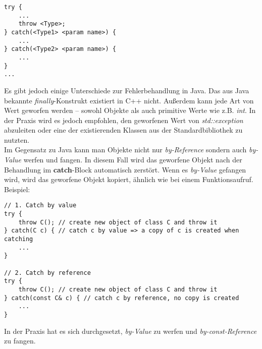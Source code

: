 \documentclass[
  accentcolor=tud1c,	%
  colorbacktitle,		%
  inverttitle,			%
  german,				%
  twoside
]{tudexercise}
\begin{document}
\begin{lstlisting}
try {
	...
	throw <Type>;
} catch(<Type1> <param name>) {
	...
} catch(<Type2> <param name>) {
	...
}
...
\end{lstlisting} 

Es gibt jedoch einige Unterschiede zur Fehlerbehandlung in Java.
Das aus Java bekannte \emph{finally}-Konstrukt existiert in C++ nicht.
Außerdem kann jede Art von Wert geworfen werden -- sowohl Objekte als auch primitive Werte wie z.B. \emph{int}.
In der Praxis wird es jedoch empfohlen, den geworfenen Wert von \emph{std::exception} abzuleiten oder eine der existierenden Klassen aus der Standardbibliothek zu nutzten. \\

Im Gegensatz zu Java kann man Objekte nicht nur \emph{by-Reference} sondern auch \emph{by-Value} werfen und fangen. In diesem Fall wird das geworfene Objekt nach der Behandlung im \textbf{catch}-Block automatisch zerstört. Wenn es \emph{by-Value} gefangen wird, wird das geworfene Objekt kopiert, ähnlich wie bei einem Funktionsaufruf. Beispiel:

\begin{lstlisting}
// 1. Catch by value
try {
	throw C(); // create new object of class C and throw it 
} catch(C c) { // catch c by value => a copy of c is created when catching
	...
}

// 2. Catch by reference
try {
	throw C(); // create new object of class C and throw it 
} catch(const C& c) { // catch c by reference, no copy is created
	...
}
\end{lstlisting} 

In der Praxis hat es sich durchgesetzt, \emph{by-Value} zu werfen und \emph{by-const-Reference} zu fangen.
\end{document}
